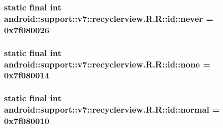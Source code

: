 \hypertarget{classandroid_1_1support_1_1v7_1_1recyclerview_1_1_r_1_1id_17d8348c5aac534ccd1b5f615f5971f5}{
\subsubsection[{never}]{\setlength{\rightskip}{0pt plus 5cm}static final int android::support::v7::recyclerview.R.R::id::never = 0x7f080026}}
\label{classandroid_1_1support_1_1v7_1_1recyclerview_1_1_r_1_1id_17d8348c5aac534ccd1b5f615f5971f5}


\hypertarget{classandroid_1_1support_1_1v7_1_1recyclerview_1_1_r_1_1id_f49f8ab52e2e627f6511f8147dc06f49}{
\subsubsection[{none}]{\setlength{\rightskip}{0pt plus 5cm}static final int android::support::v7::recyclerview.R.R::id::none = 0x7f080014}}
\label{classandroid_1_1support_1_1v7_1_1recyclerview_1_1_r_1_1id_f49f8ab52e2e627f6511f8147dc06f49}


\hypertarget{classandroid_1_1support_1_1v7_1_1recyclerview_1_1_r_1_1id_99ca1dc6681563b113ecd09f92326fc0}{
\subsubsection[{normal}]{\setlength{\rightskip}{0pt plus 5cm}static final int android::support::v7::recyclerview.R.R::id::normal = 0x7f080010}}
\label{classandroid_1_1support_1_1v7_1_1recyclerview_1_1_r_1_1id_99ca1dc6681563b113ecd09f92326fc0}


